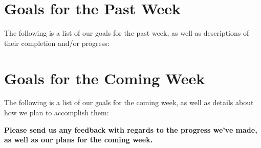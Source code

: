 \documentclass[]{../auvsi_doc}
\begin{document}
\section{Goals for the Past Week}

The following is a list of our goals for the past week, as well as descriptions of their completion and/or progress:

\begin{enumerate}
	
\end{enumerate}

\section{Goals for the Coming Week}

The following is a list of our goals for the coming week, as well as details about how we plan to accomplish them:

\begin{enumerate}

\end{enumerate}

\textbf{Please send us any feedback with regards to the progress we've made, as well as our plans for the coming week.}

%
%
%
\end{document}

